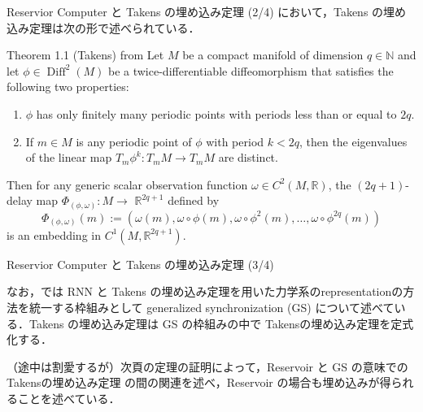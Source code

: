 \begin{frame}{Reservior Computer と Takens の埋め込み定理 \cite{Gregoryeva} (2/4)}
  \cite{Gregoryeva}において，Takens の埋め込み定理は次の形で述べられている．
  \begin{block}{Theorem 1.1 (Takens)  from \cite{Gregoryeva}}
    Let $M$ be a compact manifold of dimension $q \in \mathbb{N}$ and let $\phi \in \operatorname{Diff}^2(M)$ be a twice-differentiable diffeomorphism that satisfies the following two properties:

    \begin{enumerate}
      \item $\phi$ has only finitely many periodic points with periods less than or equal to $2 q$.
    
      \item If $m \in M$ is any periodic point of $\phi$ with period $k<2 q$, then the eigenvalues of the linear map $T_m \phi^k: T_m M \longrightarrow T_m M$ are distinct.
    \end{enumerate}
    
    Then for any generic scalar observation function $\omega \in C^2(M, \mathbb{R})$, the $(2 q+1)$-delay map $\Phi_{(\phi, \omega)}: M \longrightarrow$ $\mathbb{R}^{2 q+1}$ defined by
    $$
    \Phi_{(\phi, \omega)}(m):=\left(\omega(m), \omega \circ \phi(m), \omega \circ \phi^2(m), \ldots, \omega \circ \phi^{2 q}(m)\right)
    $$
    is an embedding in $C^1\left(M, \mathbb{R}^{2 q+1}\right)$.
  \end{block}
\end{frame}

\begin{frame}{Reservior Computer と Takens の埋め込み定理 \cite{Gregoryeva} (3/4)}

  なお，\cite{Berry}では RNN と Takens の埋め込み定理を用いた力学系のrepresentationの方法を統一する枠組みとして generalized synchronization (GS) について述べている．Takens の埋め込み定理は GS の枠組みの中で Takensの埋め込み定理を定式化する．
  
  （途中は割愛するが）次頁の定理の証明によって，Reservoir と GS の意味での Takensの埋め込み定理 の間の関連を述べ，Reservoir の場合も埋め込みが得られることを述べている．
\end{frame}


